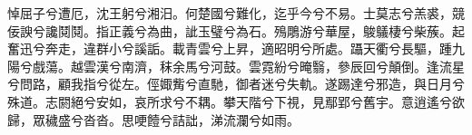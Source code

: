 
\begin{pinyinscope}
悼屈子兮遭厄，沈王躬兮湘汨。何楚國兮難化，迄乎今兮不易。士莫志兮羔裘，競佞諛兮讒鬩鬩。指正義兮為曲，訿玉璧兮為石。殦鵰游兮華屋，鵔鸃棲兮柴蔟。起奮迅兮奔走，違群小兮謑詬。載青雲兮上昇，適昭明兮所處。躡天衢兮長驅，踵九陽兮戲蕩。越雲漢兮南濟，秣余馬兮河鼓。雲霓紛兮晻翳，參辰回兮顛倒。逢流星兮問路，顧我指兮從左。俓娵觜兮直馳，御者迷兮失軌。遂踢達兮邪造，與日月兮殊道。志閼絕兮安如，哀所求兮不耦。攀天階兮下視，見鄢郢兮舊宇。意逍遙兮欲歸，眾穢盛兮沓沓。思哽饐兮詰詘，涕流瀾兮如雨。


\end{pinyinscope}
